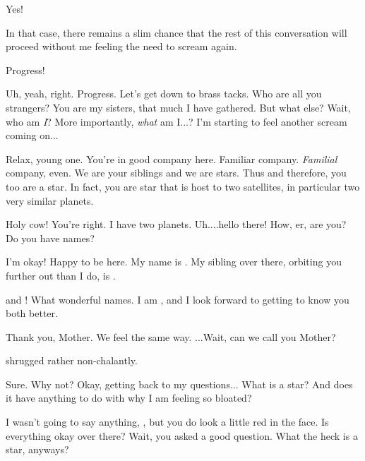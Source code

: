 \documentclass[main.tex]{subfiles}
\begin{document}
\par \Maia Yes!

\par \Sterope  In that case, there remains a slim chance that the rest of this conversation will proceed without me feeling the need to scream again.

\par \Maia Progress!

\par \Sterope Uh, yeah, right.  Progress.  Let's get down to brass tacks.  Who are all you strangers?  You are my sisters, that much I have gathered.  But what else?  Wait, who am \textit{I}?  More importantly, \textit{what} am I...?  I'm starting to feel another scream coming on...

\par \Maia Relax, young one.  You're in good company here.  Familiar company.  \textit{Familial} company, even. We are your siblings and we are stars.  Thus and therefore, you too are a star.  In fact, you are star that is host to two satellites, in particular two very similar planets. 

\par \Sterope Holy cow!  You're right.  I have two planets.  Uh....hello there!  How, er, are you?  Do you have names?

\par \Alphab I'm okay!  Happy to be here.  My name is \rmalpha.  My sibling over there, orbiting you further out than I do, is \rmbeta.

\par \Sterope \rmalpha and \rmbeta!  What wonderful names.  I am \rmsterope, and I look forward to getting to know you both better.

\par \Betab Thank you, Mother.  We feel the same way. ...Wait, can we call you Mother?

\par \nar \rmsterope shrugged rather non-chalantly.

\par \Sterope Sure.   Why not?   Okay, getting back to my questions...  What is a star?  And does it have anything to do with why I am feeling so bloated?

\par \Alcyone I wasn't going to say anything, \rmsterope, but you do look a little red in the face.  Is everything okay over there?  Wait, you asked a good question.  What the heck is a star, anyways?
\end{document}
